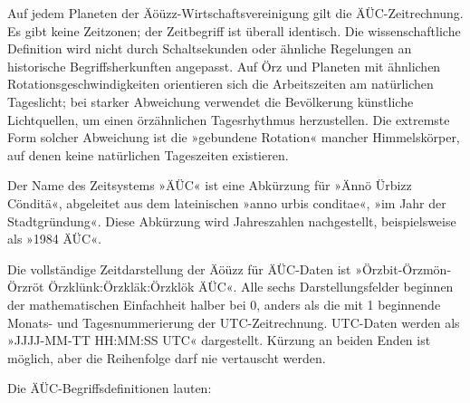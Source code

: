 Auf jedem Planeten der Äöüzz-Wirtschaftsvereinigung gilt die ÄÜC-Zeitrechnung. Es gibt keine Zeitzonen; der Zeitbegriff ist überall identisch. Die wissenschaftliche Definition wird nicht durch Schaltsekunden oder ähnliche Regelungen an historische Begriffsherkunften angepasst. Auf Örz und Planeten mit ähnlichen Rotationsgeschwindigkeiten orientieren sich die Arbeitszeiten am natürlichen Tageslicht; bei starker Abweichung verwendet die Bevölkerung künstliche Lichtquellen, um einen örzähnlichen Tagesrhythmus herzustellen. Die extremste Form solcher Abweichung ist die »gebundene Rotation« mancher Himmelskörper, auf denen keine natürlichen Tageszeiten existieren.

Der Name des Zeitsystems »ÄÜC« ist eine Abkürzung für »Ännö Ürbizz Cönditä«, abgeleitet aus dem lateinischen »anno urbis conditae«, »im Jahr der Stadtgründung«. Diese Abkürzung wird Jahreszahlen nachgestellt, beispielsweise als »1984 ÄÜC«.

Die vollständige Zeitdarstellung der Äöüzz für ÄÜC-Daten ist »Örzbit-Örzmön-Örzröt Örzklünk:Örzkläk:Örzklök ÄÜC«. Alle sechs Darstellungsfelder beginnen der mathematischen Einfachheit halber bei 0, anders als die mit 1 beginnende Monats- und Tagesnummerierung der UTC-Zeitrechnung. UTC-Daten werden als »JJJJ-MM-TT HH:MM:SS UTC« dargestellt. Kürzung an beiden Enden ist möglich, aber die Reihenfolge darf nie vertauscht werden.

Die ÄÜC-Begriffsdefinitionen lauten:

